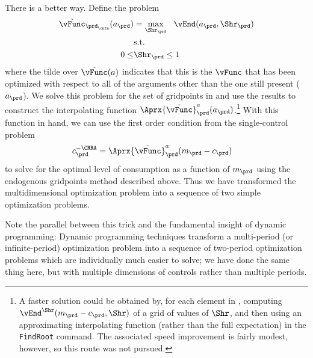 There is a better way.  Define the problem
\providecommand{\Opt}{}
\renewcommand{\Opt}{\tilde}
\providecommand{\vOpt}{}
\renewcommand{\vOpt}{\overset{*}{\vFunc}}
\begin{equation}\begin{gathered}\begin{aligned}
      \Opt{\vFunc}_{{\prd_\cntn}}({a}_{\prd})  & = \max_{\Shr_{\prd}} ~~  \vEnd({a}_{\prd},\Shr_{\prd})
      \\      & \text{s.t.} \nonumber
      \\      0 \leq & \Shr_{\prd} \leq 1
    \end{aligned}\end{gathered}\end{equation}
where the tilde over $\Opt{\vFunc}(a)$ indicates that this is the $\vFunc$ that has been optimized with respect to all of the arguments other than the one still present (${a}_{\prd}$).  We solve this problem for the set of gridpoints in  and use the results to construct the interpolating function $\Aprx{\Opt{\vFunc}}_{\prd}^{a}({a}_{\prd})$.\footnote{A faster solution could be obtained by, for each element in , computing $\vEnd^{\Shr}({m}_{\prd}-{c}_{\prd},\Shr)$ of a grid of values of $\Shr$, and then using an approximating interpolating function (rather than the full expectation) in the \texttt{FindRoot} command.  The associated speed improvement is fairly modest, however, so this route was not pursued.}  With this function in hand, we can use the first order condition from the single-control problem
\begin{equation*}\begin{gathered}\begin{aligned}
      {c}_{\prd}^{-\CRRA}  & = \Aprx{\Opt{\vFunc}}_{\prd}^{{a}}({m}_{\prd}-{c}_{\prd})
    \end{aligned}\end{gathered}\end{equation*}
to solve for the optimal level of consumption as a function of ${m}_{\prd}$ using the endogenous gridpoints method described above.  Thus we have transformed the multidimensional optimization problem into a sequence of two simple optimization problems.

Note the parallel between this trick and the fundamental insight of dynamic programming: Dynamic programming techniques transform a multi-period (or infinite-period) optimization problem into a sequence of two-period optimization problems which are individually much easier to solve; we have done the same thing here, but with multiple dimensions of controls rather than multiple periods.

